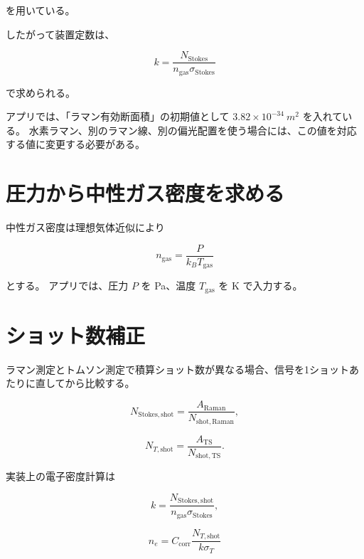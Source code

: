 \documentclass[11pt]{ltjsarticle}
\begin{document}
を用いている。

したがって装置定数は、

\begin{equation}
k =
\frac{N_{\mathrm{Stokes}}}
{n_{\mathrm{gas}}\sigma_{\mathrm{Stokes}}}
\end{equation}

で求められる。

アプリでは、「ラマン有効断面積」の初期値として
$3.82\times10^{-34}\ \si{m^2}$ を入れている。
水素ラマン、別のラマン線、別の偏光配置を使う場合には、この値を対応する値に変更する必要がある。

\section{圧力から中性ガス密度を求める}

中性ガス密度は理想気体近似により

\begin{equation}
n_{\mathrm{gas}}
=
\frac{P}{k_B T_{\mathrm{gas}}}
\end{equation}

とする。
アプリでは、圧力 $P$ を \si{Pa}、温度 $T_{\mathrm{gas}}$ を \si{K} で入力する。

\section{ショット数補正}

ラマン測定とトムソン測定で積算ショット数が異なる場合、信号を1ショットあたりに直してから比較する。

\begin{equation}
N_{\mathrm{Stokes,shot}}
=
\frac{A_{\mathrm{Raman}}}
{N_{\mathrm{shot,Raman}}},
\end{equation}

\begin{equation}
N_{T,\mathrm{shot}}
=
\frac{A_{\mathrm{TS}}}
{N_{\mathrm{shot,TS}}}.
\end{equation}

実装上の電子密度計算は

\begin{equation}
k =
\frac{N_{\mathrm{Stokes,shot}}}
{n_{\mathrm{gas}}\sigma_{\mathrm{Stokes}}},
\end{equation}

\begin{equation}
n_e =
C_{\mathrm{corr}}
\frac{N_{T,\mathrm{shot}}}
{k\sigma_T}
\end{equation}
\end{document}
